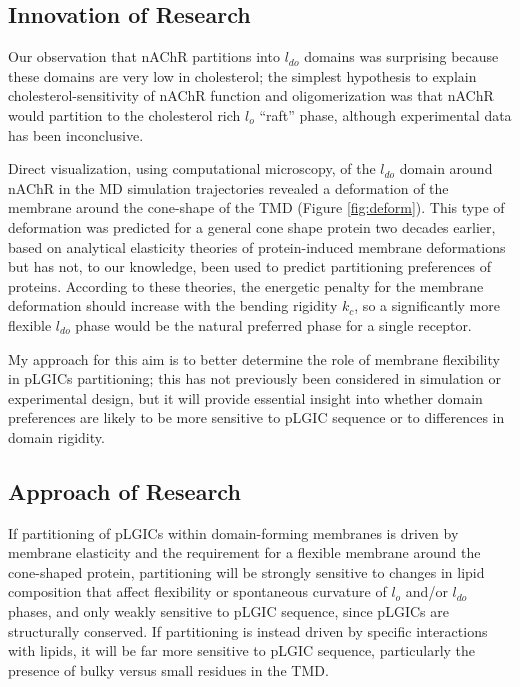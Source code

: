 \documentclass{article}
\begin{document}
\subsection{Innovation of Research}

Our observation that nAChR partitions into $l_{do}$ domains was surprising because these domains are very low in cholesterol; the simplest hypothesis to explain cholesterol-sensitivity of nAChR function and oligomerization was that nAChR would partition to the cholesterol rich $l_o$ “raft” phase, although experimental data has been inconclusive.

Direct visualization, using computational microscopy, of the $l_{do}$ domain around nAChR in the MD simulation trajectories revealed a deformation of the membrane around the cone-shape of the TMD (Figure \ref{fig:deform}). This type of deformation was predicted for a general cone shape protein two decades earlier, based on analytical elasticity theories of protein-induced membrane deformations \cite{Goulian1996,Weikl1998} but has not, to our knowledge, been used to predict partitioning preferences of proteins. According to these theories, the energetic penalty for the membrane deformation should increase with the bending rigidity $k_c$, so a significantly more flexible $l_{do}$ phase would be the natural preferred phase for a single receptor.

My approach for this aim is to better determine the role of membrane flexibility in pLGICs partitioning; this has not previously been considered in simulation or experimental design, but it will provide essential insight into whether domain preferences are likely to be more sensitive to pLGIC sequence or to differences in domain rigidity.

\subsection{Approach of Research}

If partitioning of pLGICs within domain-forming membranes is driven by membrane elasticity and the requirement for a flexible membrane around the cone-shaped protein, partitioning will be strongly sensitive to changes in lipid composition that affect flexibility or spontaneous curvature of $l_o$ and/or $l_{do}$ phases, and only weakly sensitive to pLGIC sequence, since pLGICs are structurally conserved. If partitioning is instead driven by specific interactions with lipids, it will be far more sensitive to pLGIC sequence, particularly the presence of bulky versus small residues in the TMD. 
\end{document}
